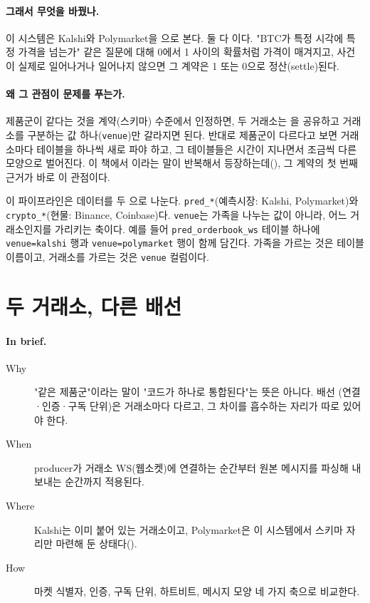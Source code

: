 \paragraph{그래서 무엇을 바꿨나.} 이 시스템은 Kalshi와 Polymarket을 으로
본다. 둘 다 이다. "BTC가 특정 시각에 특정 가격을 넘는가"
같은 질문에 대해 0에서 1 사이의 확률처럼 가격이 매겨지고, 사건이 실제로 일어나거나
일어나지 않으면 그 계약은 1 또는 0으로 정산(settle)된다.

\paragraph{왜 그 관점이 문제를 푸는가.} 제품군이 같다는 것을 계약(스키마) 수준에서
인정하면, 두 거래소는 을 공유하고 거래소를 구분하는
값 하나(\texttt{venue})만 갈라지면 된다. 반대로 제품군이 다르다고 보면 거래소마다
테이블을 하나씩 새로 파야 하고, 그 테이블들은 시간이 지나면서 조금씩 다른 모양으로
벌어진다. 이 책에서 이라는 말이 반복해서 등장하는데(),
그 계약의 첫 번째 근거가 바로 이 관점이다.

\begin{example}[가족과 축]
\label{ex:problem-family-axis}
이 파이프라인은 데이터를 두 으로 나눈다. \texttt{pred\_*}(예측시장:
Kalshi, Polymarket)와 \texttt{crypto\_*}(현물: Binance, Coinbase)다. \texttt{venue}는
가족을 나누는 값이 아니라,  어느 거래소인지를 가리키는 축이다.
예를 들어 \texttt{pred\_orderbook\_ws} 테이블 하나에 \texttt{venue=kalshi} 행과
\texttt{venue=polymarket} 행이 함께 담긴다. 가족을 가르는 것은 테이블 이름이고,
거래소를 가르는 것은 \texttt{venue} 컬럼이다.
\end{example}

\section{두 거래소, 다른 배선}
\label{sec:problem-two-venues}

\paragraph{In brief.}
\begin{description}
  \item[Why] "같은 제품군"이라는 말이 "코드가 하나로 통합된다"는 뜻은 아니다. 배선
    (연결·인증·구독 단위)은 거래소마다 다르고, 그 차이를 흡수하는 자리가 따로 있어야 한다.
  \item[When] producer가 거래소 WS(웹소켓)에 연결하는 순간부터 원본 메시지를 파싱해
    내보내는 순간까지 적용된다.
  \item[Where] Kalshi는 이미 붙어 있는 거래소이고, Polymarket은 이 시스템에서 스키마
    자리만 마련해 둔 상태다().
  \item[How] 마켓 식별자, 인증, 구독 단위, 하트비트, 메시지 모양 네 가지 축으로 비교한다.
\end{description}

